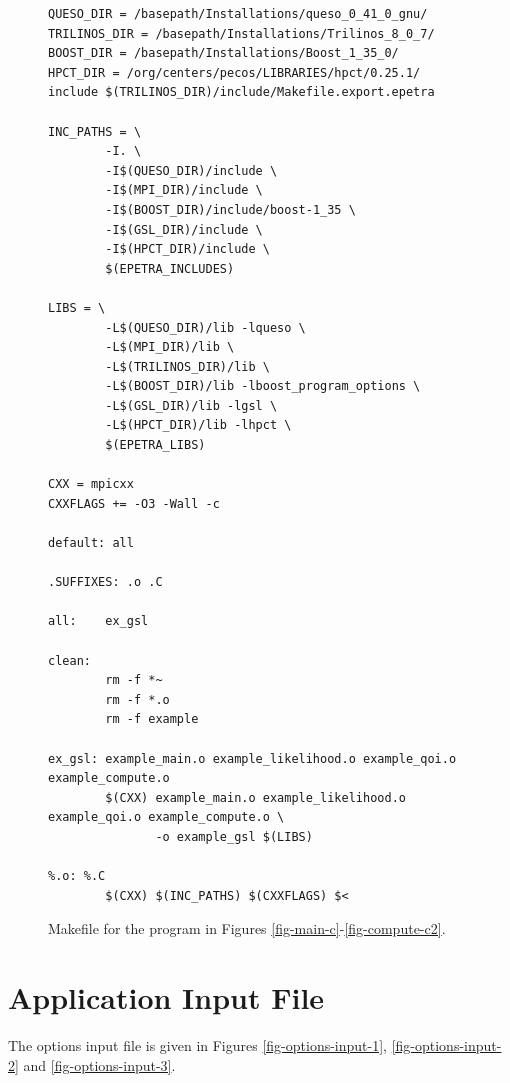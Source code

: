 \begin{figure}[h!]
\begin{center}
\begin{verbatim}
QUESO_DIR = /basepath/Installations/queso_0_41_0_gnu/
TRILINOS_DIR = /basepath/Installations/Trilinos_8_0_7/
BOOST_DIR = /basepath/Installations/Boost_1_35_0/
HPCT_DIR = /org/centers/pecos/LIBRARIES/hpct/0.25.1/
include $(TRILINOS_DIR)/include/Makefile.export.epetra

INC_PATHS = \
        -I. \
        -I$(QUESO_DIR)/include \
        -I$(MPI_DIR)/include \
        -I$(BOOST_DIR)/include/boost-1_35 \
        -I$(GSL_DIR)/include \
        -I$(HPCT_DIR)/include \
        $(EPETRA_INCLUDES)

LIBS = \
        -L$(QUESO_DIR)/lib -lqueso \
        -L$(MPI_DIR)/lib \
        -L$(TRILINOS_DIR)/lib \
        -L$(BOOST_DIR)/lib -lboost_program_options \
        -L$(GSL_DIR)/lib -lgsl \
        -L$(HPCT_DIR)/lib -lhpct \
        $(EPETRA_LIBS)

CXX = mpicxx
CXXFLAGS += -O3 -Wall -c

default: all

.SUFFIXES: .o .C

all:    ex_gsl

clean:
        rm -f *~
        rm -f *.o
        rm -f example

ex_gsl: example_main.o example_likelihood.o example_qoi.o example_compute.o
        $(CXX) example_main.o example_likelihood.o example_qoi.o example_compute.o \
               -o example_gsl $(LIBS)

%.o: %.C
        $(CXX) $(INC_PATHS) $(CXXFLAGS) $<
\end{verbatim}
\end{center}
\caption{
Makefile for the program in Figures \ref{fig-main-c}-\ref{fig-compute-c2}.
}
\label{fig-make}
\end{figure}

\clearpage
\section{Application Input File}\label{sc-appl-input-file}

The options input file is given in Figures \ref{fig-options-input-1}, \ref{fig-options-input-2} and \ref{fig-options-input-3}.

